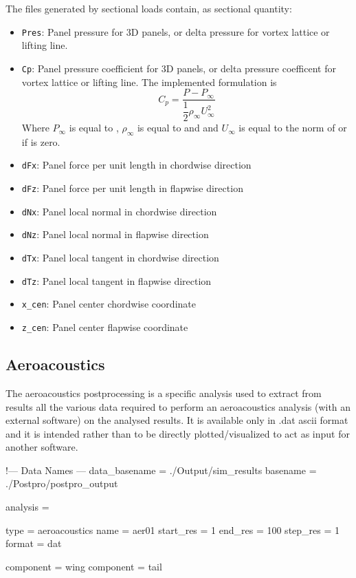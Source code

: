 The files generated by sectional loads contain, as sectional quantity:
\begin{itemize}
  \item \texttt{Pres}: Panel pressure for 3D panels, or delta pressure for vortex lattice or 
                      lifting  line. 
  \item \texttt{Cp}: Panel pressure coefficient for 3D panels, or delta pressure 
                    coefficent for vortex lattice or lifting line. The implemented formulation is 
                    \begin{equation}
                      C_p = \dfrac{P - P_\infty}{\dfrac{1}{2} \rho_\infty U_\infty^2}
                    \end{equation}
                    Where $P_\infty$ is equal to , $\rho_\infty$ is equal to  and 
                    and $U_\infty$ is equal to the norm of  or  if  is zero. 
  \item \texttt{dFx}: Panel force per unit length in chordwise direction
  \item \texttt{dFz}: Panel force per unit length in flapwise direction
  \item \texttt{dNx}: Panel local normal in chordwise direction
  \item \texttt{dNz}: Panel local normal in flapwise direction
  \item \texttt{dTx}: Panel local tangent in chordwise direction
  \item \texttt{dTz}: Panel local tangent in flapwise direction
  \item \texttt{x\_cen}: Panel center chordwise coordinate
  \item \texttt{z\_cen}: Panel center flapwise coordinate
\end{itemize}


\subsection{Aeroacoustics}
The aeroacoustics postprocessing is a specific analysis used to 
extract from results all the various data required to perform an 
aeroacoustics analysis (with an external software) on the analysed results. 
It is available only in .dat ascii format  and it is intended rather than 
to be directly plotted/visualized to act as input for another software.

\begin{inputfile}[frame=single, caption={dust\_post.in for aeroacoustics}, 
  label={file:dust_post.in_aeroacoustics}]
!--- Data Names ---
data_basename = ./Output/sim_results
basename =     ./Postpro/postpro_output

analysis = {

type = aeroacoustics
name = aer01
start_res = 1
end_res   = 100 
step_res  = 1
format = dat

component = wing
component = tail

}
\end{inputfile}

